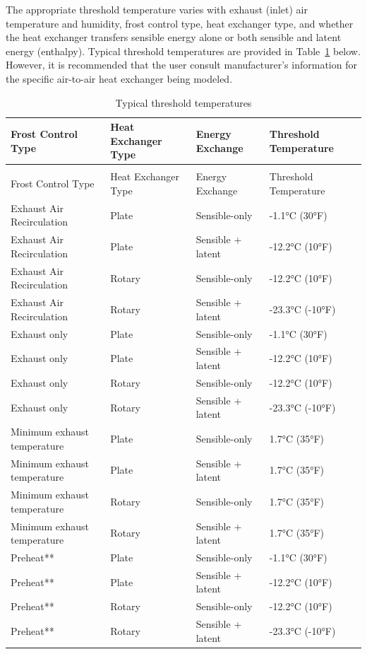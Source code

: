 The appropriate threshold temperature varies with exhaust (inlet) air temperature and humidity, frost control type, heat exchanger type, and whether the heat exchanger transfers sensible energy alone or both sensible and latent energy (enthalpy). Typical threshold temperatures are provided in Table~\ref{table:typical-threshold-temperatures} below. However, it is recommended that the user consult manufacturer's information for the specific air-to-air heat exchanger being modeled.

\begin{longtable}[c]{>{\raggedright}p{1.5in}>{\raggedright}p{1.5in}>{\raggedright}p{1.5in}>{\raggedright}p{1.5in}}
\caption{Typical threshold temperatures \label{table:typical-threshold-temperatures}} \tabularnewline
\toprule
Frost Control Type & Heat Exchanger Type & Energy Exchange & Threshold Temperature \tabularnewline
\midrule
\endfirsthead

\caption[]{Typical threshold temperatures} \tabularnewline
\toprule
Frost Control Type & Heat Exchanger Type & Energy Exchange & Threshold Temperature \tabularnewline
\midrule
\endhead

Exhaust Air Recirculation & Plate & Sensible-only & -1.1°C (30°F) \tabularnewline
Exhaust Air Recirculation & Plate & Sensible + latent & -12.2°C (10°F) \tabularnewline
Exhaust Air Recirculation & Rotary & Sensible-only & -12.2°C (10°F) \tabularnewline
Exhaust Air Recirculation & Rotary & Sensible + latent & -23.3°C (-10°F) \tabularnewline

Exhaust only & Plate & Sensible-only & -1.1°C (30°F) \tabularnewline
Exhaust only & Plate & Sensible + latent & -12.2°C (10°F) \tabularnewline
Exhaust only & Rotary & Sensible-only & -12.2°C (10°F) \tabularnewline
Exhaust only & Rotary & Sensible + latent & -23.3°C (-10°F) \tabularnewline

Minimum exhaust temperature & Plate & Sensible-only & 1.7°C (35°F) \tabularnewline
Minimum exhaust temperature & Plate & Sensible + latent & 1.7°C (35°F) \tabularnewline
Minimum exhaust temperature & Rotary & Sensible-only & 1.7°C (35°F) \tabularnewline
Minimum exhaust temperature & Rotary & Sensible + latent & 1.7°C (35°F) \tabularnewline

Preheat** & Plate & Sensible-only & -1.1°C (30°F) \tabularnewline
Preheat** & Plate & Sensible + latent & -12.2°C (10°F) \tabularnewline
Preheat** & Rotary & Sensible-only & -12.2°C (10°F) \tabularnewline
Preheat** & Rotary & Sensible + latent & -23.3°C (-10°F) \tabularnewline
\bottomrule
\end{longtable}

